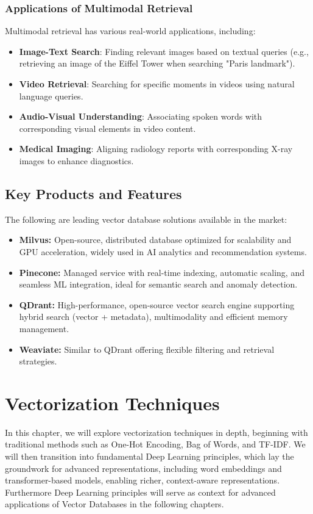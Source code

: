 \subsection{Applications of Multimodal Retrieval}
Multimodal retrieval has various real-world applications, including:
\begin{itemize}
    \item \textbf{Image-Text Search}: Finding relevant images based on textual queries (e.g., retrieving an image of the Eiffel Tower when searching "Paris landmark").
    \item \textbf{Video Retrieval}: Searching for specific moments in videos using natural language queries.
    \item \textbf{Audio-Visual Understanding}: Associating spoken words with corresponding visual elements in video content.
    \item \textbf{Medical Imaging}: Aligning radiology reports with corresponding X-ray images to enhance diagnostics.
\end{itemize}



\section{Key Products and Features}
The following are leading vector database solutions available in the market:
\begin{itemize}
    \item \textbf{Milvus:} Open-source, distributed database optimized for scalability and GPU acceleration, widely used in AI analytics and recommendation systems.
    \item \textbf{Pinecone:} Managed service with real-time indexing, automatic scaling, and seamless ML integration, ideal for semantic search and anomaly detection.
    \item \textbf{QDrant:} High-performance, open-source vector search engine supporting hybrid search (vector + metadata), multimodality and efficient memory management.
    \item \textbf{Weaviate:} Similar to QDrant offering flexible filtering and retrieval strategies.
\end{itemize}

\chapter{Vectorization Techniques}
In this chapter, we will explore vectorization techniques in depth, beginning with traditional methods such as One-Hot Encoding, Bag of Words, and TF-IDF. We will then transition into fundamental Deep Learning principles, which lay the groundwork for advanced representations, including word embeddings and transformer-based models, enabling richer, context-aware representations. Furthermore Deep Learning principles will serve as context for advanced applications of Vector Databases in the following chapters.

